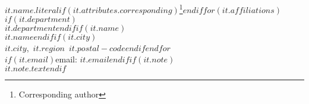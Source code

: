 \textbf{$it.name.literal$}$if(it.attributes.corresponding)$\thanks{Corresponding author}$endif$$for(it.affiliations)$$if(it.department)$\\$it.department$$endif$$if(it.name)$\\$it.name$$endif$$if(it.city)$\\$it.city$,~$it.region$~$it.postal-code$$endif$$endfor$\\$if(it.email)$email: $it.email$$endif$$if(it.note)$\\$it.note.text$$endif$\\